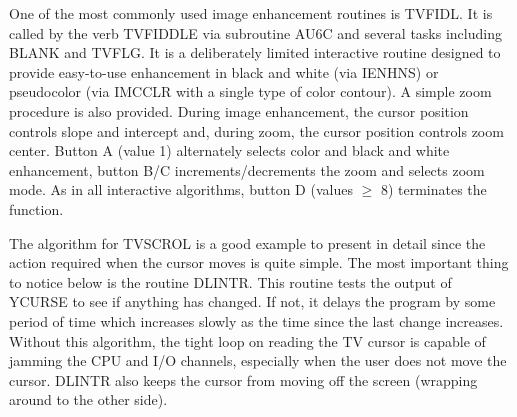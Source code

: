One of the most commonly used image enhancement routines is
TVFIDL.  It is called by the verb TVFIDDLE via
subroutine AU6C and several tasks including BLANK and
TVFLG. It is a deliberately limited interactive routine designed to
provide easy-to-use enhancement in black and white (via
IENHNS) or pseudocolor (via IMCCLR with a
single type of color contour).  A simple zoom procedure is also
provided.  During image enhancement, the cursor position controls
slope and intercept and, during zoom, the cursor position controls
zoom center.  Button A (value 1) alternately selects color and black
and white enhancement, button B/C increments/decrements the zoom and
selects zoom mode. As in all interactive algorithms, button D (values
$\geq$ 8) terminates the function.

The algorithm for TVSCROL is a good example to present in detail since
the action required when the cursor moves is quite simple.  The most
important thing to notice below is the routine DLINTR.  This routine
tests the output of YCURSE to see if anything has
changed.  If not, it delays the program by some period of time which
increases slowly as the time since the last change increases.  Without
this algorithm, the tight loop on reading the TV cursor is capable of
jamming the CPU and I/O channels, especially when the user does not
move the cursor.  DLINTR also keeps the cursor from moving off the
screen (wrapping around to the other side).

